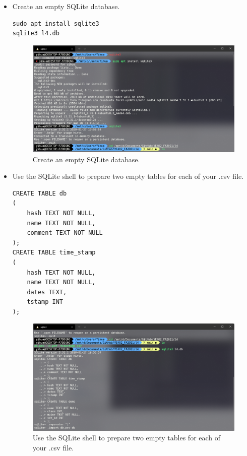 \documentclass[a4paper]{article}
\begin{document}
\begin{itemize}
    \item Create an empty SQLite database.
    \begin{verbatim}
sudo apt install sqlite3
sqlite3 l4.db
    \end{verbatim}
    \begin{figure}[H]
        \centering
        \includegraphics[width=1\textwidth]{4.png}
        \caption{Create an empty SQLite database.}
    \end{figure}
    \item Use the SQLite shell to prepare two empty tables for each of your .csv file.
    \begin{verbatim}
CREATE TABLE db
(
    hash TEXT NOT NULL,
    name TEXT NOT NULL,
    comment TEXT NOT NULL
);
CREATE TABLE time_stamp
(
    hash TEXT NOT NULL,
    name TEXT NOT NULL,
    dates TEXT,
    tstamp INT
);
    \end{verbatim}
    \begin{figure}[H]
        \centering
        \includegraphics[width=1\textwidth]{5.png}
        \caption{Use the SQLite shell to prepare two empty tables for each of your .csv file.}

\end{figure}
\end{itemize}
\end{document}
